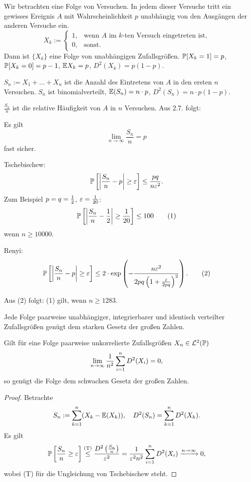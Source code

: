 \begin{exmp}
  Wir betrachten eine Folge von Versuchen. In jedem dieser Versuche tritt ein
  gewisses Ereignis $A$ mit Wahrscheinlichkeit $p$ unabhängig von den Ausgängen
  der anderen Versuche ein.
  \[ X_k := \begin{cases} 1,
      & \text{wenn $A$ im $k$-ten Versuch eingetreten  ist,}
      \\ 0, & \text{sonst.}
    \end{cases} \]
  Dann ist $\{ X_k \}$ eine Folge von unabhängigen Zufallsgrößen. $\mathbb{P}[X_k =
  1] = p$, $\mathbb{P}[X_k = 0] = p - 1$, $\mathbb{E} X_k = p$, $D^2(X_k) = p(1-p)$.

  $S_n := X_1 + \ldots + X_n$ ist die Anzahl des Eintretens von $A$ in den
  ersten $n$ Versuchen. $S_n$ ist binomialverteilt, $\mathbb{E}(S_n) = n \cdot p$, $D^2
  (S_n) = n \cdot p(1-p)$.

  $\frac{S_n}{n}$ ist die relative Häufigkeit von $A$ in $n$ Versuchen. Aus 2.7.
  folgt:
\end{exmp}

\begin{thm}[Borel]
  Es gilt
  \[ \lim_{n \to \infty} \frac{S_n}{n} = p \]
  fast sicher.
\end{thm}

\begin{rmrk*}
  Tschebischew:
  \[ \mathbb{P} \left[ \left| \frac{S_n}{n} - p \right| \ge \varepsilon \right] \le
    \frac{pq}{n \varepsilon^2}. \]
  Zum Beispiel $p = q = \frac{1}{2}$, $\varepsilon = \frac{1}{20}$:
  \[ \mathbb{P} \left[ \left| \frac{S_n}{n} - \frac{1}{2} \right| \ge \frac{1}{20} \right] \le
    100 \tag{1} \]
  wenn $n \ge 10000$.

  Renyi:
  \[ \mathbb{P} \left[ \left| \frac{S_n}{n} - p \right| \ge \varepsilon \right] \le 2 \cdot
    \exp \left( - \frac{n \varepsilon^2}{2 pq \left(1 + \frac{\varepsilon}{2pq} \right)^2} \right).
    \tag{2} \]

  Aus (2) folgt: (1) gilt, wenn $n \ge 1283$.
\end{rmrk*}

\begin{thm}[Etemadi]
  Jede Folge paarweise unabhängiger, integrierbarer und identisch verteilter
  Zufallsgrößen genügt dem starken Gesetz der großen Zahlen.
\end{thm}

\begin{thm}[Khinchin]
  Gilt für eine Folge paarweise unkorrelierte Zufallsgrößen $X_n \in
  \mathcal{L}^2(\mathbb{P})$
  \[ \lim_{n \to \infty} \frac{1}{n^2} \sum_{i=1}^n D^2(X_i) = 0, \]
  so genügt die Folge dem schwachen Gesetz der großen Zahlen.
\end{thm}

\begin{proof}
  Betrachte
  \[ S_n := \sum_{k=1}^n (X_k - \mathbb{E}(X_k)), \quad D^2(S_n) = \sum_{k=1}^n
    D^2(X_k). \]
  Es gilt
  \[ \mathbb{P} \left[ \frac{S_n}{n} \ge \varepsilon \right]
    \overset{\text{(T)}} \le \frac{D^2 \left(  \frac{S_n}{n} \right)}{\varepsilon^2}
    = \frac{1}{\varepsilon^2 n^2}  \sum_{i = 1}^n D^2(X_i) \xrightarrow{n \to \infty} 0, \]
  wobei (T) für die Ungleichung von Tschebischew steht.
\end{proof}